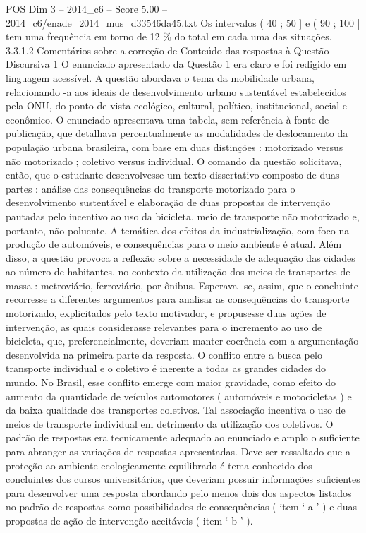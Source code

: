 \begin{textsample}{POS Dim 3 – 2014\_c6 – Score 5.00 – 2014\_c6/enade\_2014\_mus\_d33546da45.txt}
Os intervalos ( 40 ; 50 ] e ( 90 ; 100 ] tem uma frequência em torno de 12 \% do total em cada uma das situações. 3.3.1.2 Comentários sobre a correção de Conteúdo das respostas à Questão Discursiva 1 O enunciado apresentado da Questão 1 era claro e foi redigido em linguagem acessível.
A questão abordava o tema da mobilidade urbana, relacionando -a aos ideais de desenvolvimento urbano sustentável estabelecidos pela ONU, do ponto de vista ecológico, cultural, político, institucional, social e econômico.
O enunciado apresentava uma tabela, sem referência à fonte de publicação, que detalhava percentualmente as modalidades de deslocamento da população urbana brasileira, com base em duas distinções : motorizado versus não motorizado ; coletivo versus individual.
O comando da questão solicitava, então, que o estudante desenvolvesse um texto dissertativo composto de duas partes : análise das consequências do transporte motorizado para o desenvolvimento sustentável e elaboração de duas propostas de intervenção pautadas pelo incentivo ao uso da bicicleta, meio de transporte não motorizado e, portanto, não poluente.
A temática dos efeitos da industrialização, com foco na produção de automóveis, e consequências para o meio ambiente é atual.
Além disso, a questão provoca a reflexão sobre a necessidade de adequação das cidades ao número de habitantes, no contexto da utilização dos meios de transportes de massa : metroviário, ferroviário, por ônibus.
Esperava -se, assim, que o concluinte recorresse a diferentes argumentos para analisar as consequências do transporte motorizado, explicitados pelo texto motivador, e propusesse duas ações de intervenção, as quais considerasse relevantes para o incremento ao uso de bicicleta, que, preferencialmente, deveriam manter coerência com a argumentação desenvolvida na primeira parte da resposta.
O conflito entre a busca pelo transporte individual e o coletivo é inerente a todas as grandes cidades do mundo.
No Brasil, esse conflito emerge com maior gravidade, como efeito do aumento da quantidade de veículos automotores ( automóveis e motocicletas ) e da baixa qualidade dos transportes coletivos.
Tal associação incentiva o uso de meios de transporte individual em detrimento da utilização dos coletivos.
O padrão de respostas era tecnicamente adequado ao enunciado e amplo o suficiente para abranger as variações de respostas apresentadas.
Deve ser ressaltado que a proteção ao ambiente ecologicamente equilibrado é tema conhecido dos concluintes dos cursos universitários, que deveriam possuir informações suficientes para desenvolver uma resposta abordando pelo menos dois dos aspectos listados no padrão de respostas como possibilidades de consequências ( item ‘ a ’ ) e duas propostas de ação de intervenção aceitáveis ( item ‘ b ’ ).

\end{textsample}
